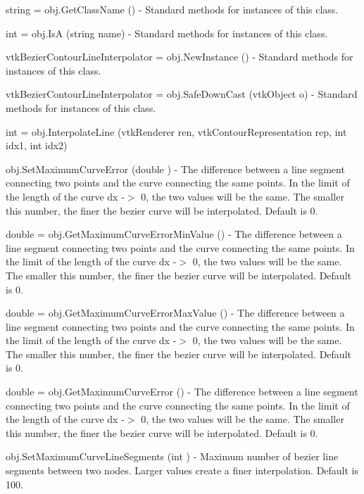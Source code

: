 \begin{DoxyItemize}
\item {\ttfamily string = obj.\-Get\-Class\-Name ()} -\/ Standard methods for instances of this class.  
\item {\ttfamily int = obj.\-Is\-A (string name)} -\/ Standard methods for instances of this class.  
\item {\ttfamily vtk\-Bezier\-Contour\-Line\-Interpolator = obj.\-New\-Instance ()} -\/ Standard methods for instances of this class.  
\item {\ttfamily vtk\-Bezier\-Contour\-Line\-Interpolator = obj.\-Safe\-Down\-Cast (vtk\-Object o)} -\/ Standard methods for instances of this class.  
\item {\ttfamily int = obj.\-Interpolate\-Line (vtk\-Renderer ren, vtk\-Contour\-Representation rep, int idx1, int idx2)}  
\item {\ttfamily obj.\-Set\-Maximum\-Curve\-Error (double )} -\/ The difference between a line segment connecting two points and the curve connecting the same points. In the limit of the length of the curve dx -\/$>$ 0, the two values will be the same. The smaller this number, the finer the bezier curve will be interpolated. Default is 0.  
\item {\ttfamily double = obj.\-Get\-Maximum\-Curve\-Error\-Min\-Value ()} -\/ The difference between a line segment connecting two points and the curve connecting the same points. In the limit of the length of the curve dx -\/$>$ 0, the two values will be the same. The smaller this number, the finer the bezier curve will be interpolated. Default is 0.  
\item {\ttfamily double = obj.\-Get\-Maximum\-Curve\-Error\-Max\-Value ()} -\/ The difference between a line segment connecting two points and the curve connecting the same points. In the limit of the length of the curve dx -\/$>$ 0, the two values will be the same. The smaller this number, the finer the bezier curve will be interpolated. Default is 0.  
\item {\ttfamily double = obj.\-Get\-Maximum\-Curve\-Error ()} -\/ The difference between a line segment connecting two points and the curve connecting the same points. In the limit of the length of the curve dx -\/$>$ 0, the two values will be the same. The smaller this number, the finer the bezier curve will be interpolated. Default is 0.  
\item {\ttfamily obj.\-Set\-Maximum\-Curve\-Line\-Segments (int )} -\/ Maximum number of bezier line segments between two nodes. Larger values create a finer interpolation. Default is 100.  

\end{DoxyItemize}
